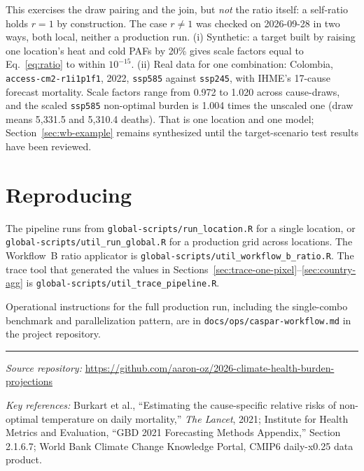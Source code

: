 \documentclass[11pt]{article}
\begin{document}
This exercises the draw pairing and the join, but \emph{not} the ratio
itself: a self-ratio holds $r = 1$ by construction. The case $r \neq 1$
was checked on 2026-09-28 in two ways, both local, neither a production
run. (i) Synthetic: a target built by raising one location's heat and cold
PAFs by 20\% gives scale factors equal to Eq.~\eqref{eq:ratio} to within
$10^{-15}$. (ii) Real data for one combination: Colombia,
\texttt{access-cm2-r1i1p1f1}, 2022, \texttt{ssp585} against
\texttt{ssp245}, with IHME's 17-cause forecast mortality. Scale factors
range from 0.972 to 1.020 across cause-draws, and the scaled
\texttt{ssp585} non-optimal burden is 1.004 times the unscaled one (draw
means 5{,}331.5 and 5{,}310.4 deaths). That is one location and one model;
Section~\ref{sec:wb-example} remains synthesized until the
target-scenario test results have been reviewed.

\section{Reproducing}

The pipeline runs from \texttt{global-scripts/run\_location.R} for a
single location, or \texttt{global-scripts/util\_run\_global.R} for a
production grid across locations. The Workflow~B ratio applicator is
\texttt{global-scripts/util\_workflow\_b\_ratio.R}. The trace tool that
generated the values in
Sections~\ref{sec:trace-one-pixel}--\ref{sec:country-agg} is
\texttt{global-scripts/util\_trace\_pipeline.R}.

Operational instructions for the full production run, including the
single-combo benchmark and parallelization pattern, are in
\texttt{docs/ops/caspar-workflow.md} in the project repository.

\bigskip
\hrule
\smallskip

\textit{Source repository:}
\url{https://github.com/aaron-oz/2026-climate-health-burden-projections}

\textit{Key references:}
Burkart et al., ``Estimating the cause-specific relative risks of
non-optimal temperature on daily mortality,''
\textit{The Lancet}, 2021;
Institute for Health Metrics and Evaluation, ``GBD 2021 Forecasting
Methods Appendix,'' Section 2.1.6.7;
World Bank Climate Change Knowledge Portal, CMIP6 daily-x0.25 data
product.
\end{document}
